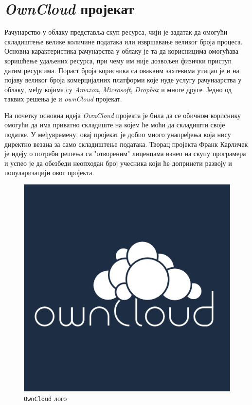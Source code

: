 \chapter{\textit{OwnCloud} пројекат}
\label{chap:ownCloud}
Рачунарство у облаку представља скуп ресурса, чији је задатак да омогући складиштење велике количине података или извршавање великог броја процеса. Основна карактеристика рачунарства у облаку је та да корисницима омогућава коришћење удаљених ресурса, при чему им није дозвољен физички приступ датим ресурсима. Пораст броја корисника са оваквим захтевима утицао је и на појаву великог броја комерцијалних платформи које нуде услугу рачунаарства у облаку, међу којима су \textit{Amazon}, \textit{Microsoft}, \textit{Dropbox} и многе друге. Једно од таквих решења је и \textit{ownCloud}\cite{owncloud} пројекат. 

На почетку основна идеја \textit{OwnCloud} пројекта је била да се обичном кориснику омогући да има приватно складиште на којем ће моћи да складишти своје податке. У међувремену, овај пројекат је добио много унапређења која нису директно везана за само складиштење података. Творац пројекта  Франк Карличек је идеју о потреби решења са "отвореним" лиценцама изнео на скупу програмера и успео је да обезбеди неопходан број учесника који ће допринети развоју и популаризацији овог пројекта.

\begin{figure}[H]
	\centering
	\includegraphics[scale=0.4]{slike/owncloud_logo.png}
	\caption{\texttt{OwnCloud} лого}
\end{figure}

